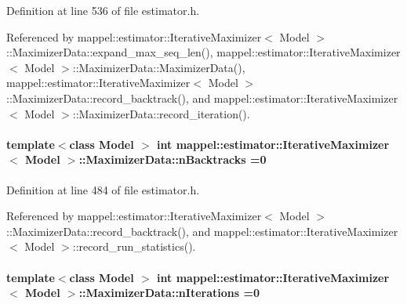Definition at line 536 of file estimator.\+h.



Referenced by mappel\+::estimator\+::\+Iterative\+Maximizer$<$ Model $>$\+::\+Maximizer\+Data\+::expand\+\_\+max\+\_\+seq\+\_\+len(), mappel\+::estimator\+::\+Iterative\+Maximizer$<$ Model $>$\+::\+Maximizer\+Data\+::\+Maximizer\+Data(), mappel\+::estimator\+::\+Iterative\+Maximizer$<$ Model $>$\+::\+Maximizer\+Data\+::record\+\_\+backtrack(), and mappel\+::estimator\+::\+Iterative\+Maximizer$<$ Model $>$\+::\+Maximizer\+Data\+::record\+\_\+iteration().

\paragraph[{\texorpdfstring{n\+Backtracks}{nBacktracks}}]{\setlength{\rightskip}{0pt plus 5cm}template$<$class Model $>$ int {\bf mappel\+::estimator\+::\+Iterative\+Maximizer}$<$ Model $>$\+::Maximizer\+Data\+::n\+Backtracks =0}\hypertarget{classmappel_1_1estimator_1_1IterativeMaximizer_1_1MaximizerData_a38c5825b8f0de1132858b23457c79fa7}{}\label{classmappel_1_1estimator_1_1IterativeMaximizer_1_1MaximizerData_a38c5825b8f0de1132858b23457c79fa7}


Definition at line 484 of file estimator.\+h.



Referenced by mappel\+::estimator\+::\+Iterative\+Maximizer$<$ Model $>$\+::\+Maximizer\+Data\+::record\+\_\+backtrack(), and mappel\+::estimator\+::\+Iterative\+Maximizer$<$ Model $>$\+::record\+\_\+run\+\_\+statistics().

\paragraph[{\texorpdfstring{n\+Iterations}{nIterations}}]{\setlength{\rightskip}{0pt plus 5cm}template$<$class Model $>$ int {\bf mappel\+::estimator\+::\+Iterative\+Maximizer}$<$ Model $>$\+::Maximizer\+Data\+::n\+Iterations =0}\hypertarget{classmappel_1_1estimator_1_1IterativeMaximizer_1_1MaximizerData_af335e6189ff196756aac6fd9b4bc53e0}{}\label{classmappel_1_1estimator_1_1IterativeMaximizer_1_1MaximizerData_af335e6189ff196756aac6fd9b4bc53e0}


